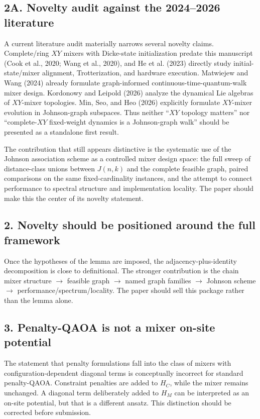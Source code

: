 \documentclass[11pt]{article}
\begin{document}
\subsection*{2A. Novelty audit against the 2024--2026 literature}
A current literature audit materially narrows several novelty claims. Complete/ring $XY$ mixers with Dicke-state initialization predate this manuscript (Cook et al., 2020; Wang et al., 2020), and He et al. (2023) directly study initial-state/mixer alignment, Trotterization, and hardware execution. Matwiejew and Wang (2024) already formulate graph-informed continuous-time-quantum-walk mixer design. Kordonowy and Leipold (2026) analyze the dynamical Lie algebras of $XY$-mixer topologies. Min, Seo, and Heo (2026) explicitly formulate $XY$-mixer evolution in Johnson-graph subspaces. Thus neither ``$XY$ topology matters'' nor ``complete-$XY$ fixed-weight dynamics is a Johnson-graph walk'' should be presented as a standalone first result.

The contribution that still appears distinctive is the systematic use of the Johnson association scheme as a controlled mixer design space: the full sweep of distance-class unions between $J(n,k)$ and the complete feasible graph, paired comparisons on the same fixed-cardinality instances, and the attempt to connect performance to spectral structure and implementation locality. The paper should make this the center of its novelty statement.

\subsection*{2. Novelty should be positioned around the full framework}
Once the hypotheses of the lemma are imposed, the adjacency-plus-identity decomposition is close to definitional. The stronger contribution is the chain mixer structure $\to$ feasible graph $\to$ named graph families $\to$ Johnson scheme $\to$ performance/spectrum/locality. The paper should sell this package rather than the lemma alone.

\subsection*{3. Penalty-QAOA is not a mixer on-site potential}
The statement that penalty formulations fall into the class of mixers with configuration-dependent diagonal terms is conceptually incorrect for standard penalty-QAOA. Constraint penalties are added to $H_C$, while the mixer remains unchanged. A diagonal term deliberately added to $H_M$ can be interpreted as an on-site potential, but that is a different ansatz. This distinction should be corrected before submission.
\end{document}
